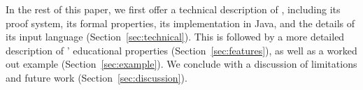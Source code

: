 In the rest of this paper, we first offer a technical description of \oops,
including its proof system, its formal properties, its implementation in Java,
and the details of its input language (Section~\ref{sec:technical}).
This is followed by a more detailed description of \oops' educational
properties (Section~\ref{sec:features}), as well as a worked out example
(Section~\ref{sec:example}).
We conclude with a discussion of limitations and future work
(Section~\ref{sec:discussion}).
